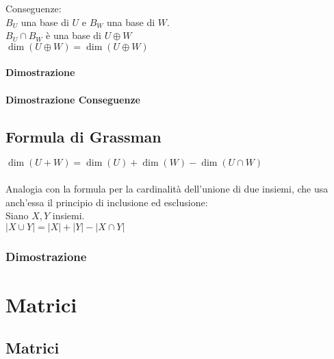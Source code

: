 \documentclass[a4paper, twoside, italian, 11pt]{book}
\newcommand{\card}[1] {\left | #1 \right |}
\begin{document}
\noindent
Conseguenze: \\

\noindent
$B_U$ una base di $U$ e $B_W$ una base di $W$. \\
$B_U \cap B_W$ è una base di $U \oplus W$ \\

\noindent
$\dim(U \oplus W) = \dim(U \oplus W)$


\subsubsection{Dimostrazione}



\subsubsection{Dimostrazione Conseguenze}




\section{Formula di Grassman}

$\dim(U + W) = \dim(U) + \dim(W) - \dim(U \cap W)$ \\\\

\noindent
Analogia con la formula per la cardinalità dell'unione di due insiemi, che usa anch'essa il principio di inclusione ed esclusione: \\

\noindent
Siano $X, Y$ insiemi. \\

\noindent
$\card{X \cup Y} = \card X + \card Y - \card{X \cap Y}$


\subsection{Dimostrazione}




\chapter{Matrici}



\section {Matrici}
\end{document}
